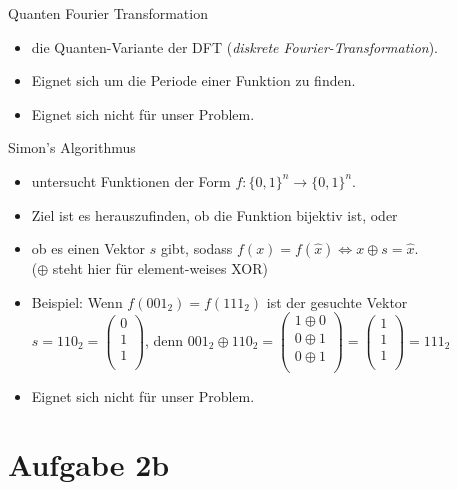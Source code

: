 \documentclass[fleqn,compress,utf8,aspectratio=169,t]{beamer}
\begin{document}
\begin{frame}{Quanten Fourier Transformation}
\begin{itemize}
	\item die Quanten-Variante der DFT (\textit{diskrete Fourier-Transformation}).
	\item Eignet sich um die Periode einer Funktion zu finden.
	\item Eignet sich nicht für unser Problem.
\end{itemize}
\end{frame}

\begin{frame}{Simon's Algorithmus}
\begin{itemize}
	\item untersucht Funktionen der Form $f: \{0, 1\}^n \rightarrow \{0, 1\}^n$.
	\item Ziel ist es herauszufinden, ob die Funktion bijektiv ist, oder
	\item ob es einen Vektor $s$ gibt, sodass $f(x) = f(\hat{x}) \Leftrightarrow x \oplus s = \hat{x}$.\\
	($\oplus$ steht hier für element-weises XOR)
	\item Beispiel: Wenn $f(001_2) = f(111_2)$ ist der gesuchte Vektor\\
	$s = 110_2 = 
	\begin{pmatrix}
	0 \\
	1 \\
	1 \\
	\end{pmatrix}$,
	denn $001_2 \oplus 110_2 =
	\begin{pmatrix}
	1 \oplus 0 \\
	0 \oplus 1 \\
	0 \oplus 1 \\
	\end{pmatrix}
	=
	\begin{pmatrix}
	1 \\
	1 \\
	1 \\
	\end{pmatrix}
	= 111_2$
	\item Eignet sich nicht für unser Problem.
\end{itemize}
\end{frame}

\section{Aufgabe 2b}
\end{document}
